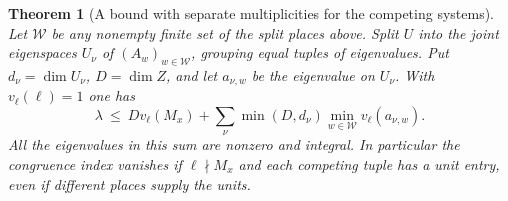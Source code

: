 \documentclass[a4paper,11pt]{article}
\newtheorem{theorem}[proposition]{Theorem}
\theoremstyle{definition}
\theoremstyle{remark}
\numberwithin{equation}{section}
\begin{document}
\begin{theorem}[A bound with separate multiplicities for the competing systems]
\leavevmode\label{thm:heckeflag785}
Let \(\mathcal W\) be any nonempty finite set of the split
places above. Split \(U\) into the joint eigenspaces
\(U_\nu\) of \((A_w)_{w\in\mathcal W}\), grouping equal
tuples of eigenvalues. Put \(d_\nu=\dim U_\nu\),
\(D=\dim Z\), and let \(a_{\nu,w}\) be the eigenvalue
on \(U_\nu\). With \(v_\ell(\ell)=1\) one has
\[
 \lambda\ \le\ D v_\ell(M_x)
       +\sum_\nu \min(D,d_\nu)
                         \min_{w\in\mathcal W}v_\ell(a_{\nu,w}).
\]
All the eigenvalues in this sum are nonzero and integral.
In particular the congruence index vanishes if
\(\ell\nmid M_x\) and each competing tuple has a unit
entry, even if different places supply the units.
\end{theorem}
\end{document}
